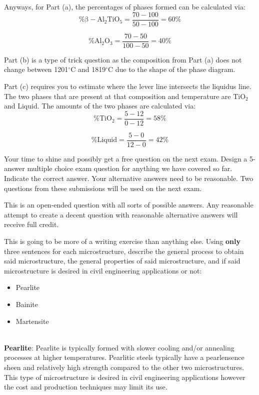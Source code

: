 \documentclass[addpoints,12pt,answers]{exam}
\begin{document}
\begin{questions}
\begin{solution}
Anyways, for Part (a), the percentages of phases formed can be calculated via:
\[
\mathrm{\% \beta-Al_2TiO_5}=\dfrac{70-100}{50-100}=60\%
\]

\[
\mathrm{\% Al_2O_3}=\dfrac{70-50}{100-50}=40\%
\]

Part (b) is a type of trick question as the composition from Part (a) does not change between 1201$^\circ$C and 1819$^\circ$C due to the shape of the phase diagram.

Part (c) requires you to estimate where the lever line intersects the liquidus line. The two phases that are present at that composition and temperature are TiO$_2$ and Liquid. The amounts of the two phases are calculated via:
\[
\mathrm{\% TiO_2}=\dfrac{5-12}{0-12}=58\%
\]

\[
\mathrm{\% Liquid}=\dfrac{5-0}{12-0}=42\%
\]
\end{solution}

\question[5] Your time to shine and possibly get a free question on the next exam. Design a 5-answer multiple choice exam question for anything we have covered so far. Indicate the correct answer. Your alternative answers need to be reasonable. Two questions from these submissions will be used on the next exam.

\begin{solution}
This is an open-ended question with all sorts of possible answers. Any reasonable attempt to create a decent question with reasonable alternative answers will receive full credit.
\end{solution}

\newpage
\question[9] This is going to be more of a writing exercise than anything else. Using \textbf{only} three sentences for each microstructure, describe the general process to obtain said microstructure, the general properties of said microstructure, and if said microstructure is desired in civil engineering applications or not:
\begin{itemize}
    \item Pearlite
    \item Bainite
    \item Martensite
\end{itemize}

\begin{solution}\\
\textbf{Pearlite}: Pearlite is typically formed with slower cooling and/or annealing processes at higher temperatures. Pearlitic steels typically have a pearlensence sheen and relatively high strength compared to the other two microstructures. This type of microstructure is desired in civil engineering applications however the cost and production techniques may limit its use.\\


\end{solution}
\end{questions}
\end{document}
